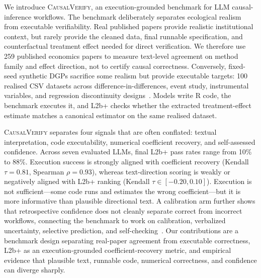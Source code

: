 \documentclass{article}
\begin{document}
We introduce \textsc{CausalVerify}, an execution-grounded benchmark for
LLM causal-inference workflows. The benchmark deliberately separates
ecological realism from executable verifiability. Real published papers
provide realistic institutional context, but rarely provide the cleaned
data, final runnable specification, and counterfactual treatment effect
needed for direct verification. We therefore use 259 published
economics papers to measure text-level agreement on method family and
effect direction, not to certify causal correctness. Conversely,
fixed-seed synthetic DGPs sacrifice some realism but provide executable
targets: 100 realised CSV datasets across difference-in-differences,
event study, instrumental variables, and regression discontinuity
designs~\citep{imbens1994identification,angrist1996identification,
thistlethwaite1960regression,imbens2008rdd,lee2010rdd,
calonico2014robust,mackinlay1997event,bertrand2004trust,
abadie2005semiparametric,callaway2021did,goodmanbacon2021did,
sun2021eventstudy,santanna2020drdid,roth2023trending}.
Models write R code, the
benchmark executes it, and L2b+ checks whether the extracted
treatment-effect estimate matches a canonical estimator on the same
realised dataset.

\textsc{CausalVerify} separates four signals that are often conflated:
textual interpretation, code executability, numerical coefficient
recovery, and self-assessed confidence. Across seven evaluated LLMs,
final L2b+ pass rates range from 10\% to 88\%. Execution success is
strongly aligned with coefficient recovery (Kendall $\tau = 0.81$,
Spearman $\rho = 0.93$), whereas text-direction scoring is weakly or
negatively aligned with L2b+ ranking (Kendall $\tau \in [-0.20,
0.10]$). Execution is not sufficient---some code runs and estimates
the wrong coefficient---but it is more informative than plausible
directional text. A calibration arm further shows that retrospective
confidence does not cleanly separate correct from incorrect workflows,
connecting the benchmark to work on calibration, verbalized
uncertainty, selective prediction, and
self-checking~\citep{guo2017calibration,geifman2017selective,
jiang2021know,lin2022uncertaintywords,mielke2022linguistic,
kadavath2022know,kuhn2023semantic,manakul2023selfcheckgpt,
tian2023calibration,xiong2024uncertainty}. Our contributions are a
benchmark design separating real-paper agreement from executable
correctness, L2b+ as an execution-grounded coefficient-recovery
metric, and empirical evidence that plausible text, runnable code,
numerical correctness, and confidence can diverge sharply.
\end{document}
